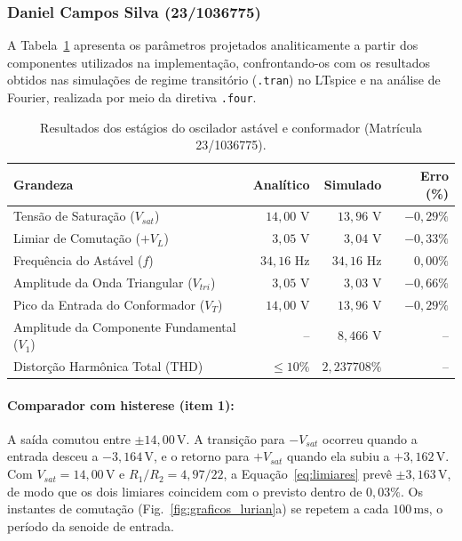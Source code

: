\documentclass[11pt,a4paper]{article}
\begin{document}
\subsubsection{Daniel Campos Silva (23/1036775)}

A Tabela~\ref{tab:resultados_daniel} apresenta os parâmetros projetados analiticamente a partir dos componentes utilizados na implementação, confrontando-os com os resultados obtidos nas simulações de regime transitório (\texttt{.tran}) no LTspice e na análise de Fourier, realizada por meio da diretiva \texttt{.four}.

\begin{table}[H]
    \centering
    \caption{Resultados dos estágios do oscilador astável e conformador (Matrícula 23/1036775).}
    \label{tab:resultados_daniel}
    \renewcommand{\arraystretch}{1.2}
    \begin{tabular}{@{}lrrr@{}}
    \toprule
    \textbf{Grandeza} & \textbf{Analítico} & \textbf{Simulado} & \textbf{Erro (\%)} \\
    \midrule
    Tensão de Saturação ($V_{sat}$) & $14{,}00\text{ V}$ & $13{,}96\text{ V}$ & $-0{,}29\%$ \\
    Limiar de Comutação ($+V_L$) & $3{,}05\text{ V}$ & $3{,}04\text{ V}$ & $-0{,}33\%$ \\
    Frequência do Astável ($f$) & $34{,}16\text{ Hz}$ & $34{,}16\text{ Hz}$ & $0{,}00\%$ \\
    Amplitude da Onda Triangular ($V_{tri}$) & $3{,}05\text{ V}$ & $3{,}03\text{ V}$ & $-0{,}66\%$ \\
    Pico da Entrada do Conformador ($V_T$) & $14{,}00\text{ V}$ & $13{,}96\text{ V}$ & $-0{,}29\%$ \\
    Amplitude da Componente Fundamental ($V_1$) & -- & $8{,}466\text{ V}$ & -- \\
    Distorção Harmônica Total (THD) & $\leq 10\%$ & $2{,}237708\%$ & -- \\
    \bottomrule
    \end{tabular}
\end{table}

\paragraph{Comparador com histerese (item 1):}
A saída comutou entre $\pm14{,}00\,\text{V}$. A transição para $-V_{sat}$ ocorreu quando a entrada desceu a $-3{,}164\,\text{V}$, e o retorno para $+V_{sat}$ quando ela subiu a $+3{,}162\,\text{V}$. Com $V_{sat}=14{,}00\,\text{V}$ e $R_1/R_2=4{,}97/22$, a Equação~\ref{eq:limiares} prevê $\pm3{,}163\,\text{V}$, de modo que os dois limiares coincidem com o previsto dentro de $0{,}03\%$. Os instantes de comutação (Fig.~\ref{fig:graficos_lurian}a) se repetem a cada $100\,\text{ms}$, o período da senoide de entrada.
\end{document}
